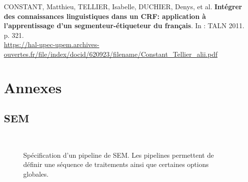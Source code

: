 \documentclass[12pt,a4paper,times,twoside,openright]{report}
\begin{document}
    CONSTANT, Matthieu, TELLIER, Isabelle, DUCHIER, Denys, et al. \textbf{Intégrer des connaissances linguistiques dans un CRF: application à l'apprentissage d'un segmenteur-étiqueteur du français}. In : TALN 2011. p. 321.\\
    \url{https://hal-upec-upem.archives-ouvertes.fr/file/index/docid/620923/filename/Constant_Tellier_alii.pdf}

\chapter*{Annexes}




\section*{SEM}
\begin{figure}[ht!]
\footnotesize
\begin{xml}
\\
\end{xml}
\caption{Spécification d'un pipeline de SEM. Les pipelines permettent de définir une séquence de traitements ainsi que certaines options globales.}
\label{fig:sem-pipeline}
\end{figure}
\end{document}
